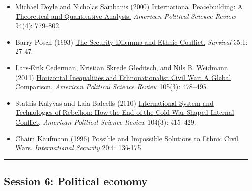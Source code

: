 \documentclass[12pt, a4paper]{article}
\begin{document}
\begin{itemize}
  \item Michael Doyle and Nicholas Sambanis (2000) \href{https://doi.org/10.2307/2586208}{International Peacebuilding: A Theoretical and Quantitative Analysis.} \textit{American Political Science Review} 94(4): 779--802.
  \item Barry Posen (1993) \href{https://doi.org/10.1080/00396339308442672}{The Security Dilemma and Ethnic Conflict.} \textit{Survival} 35:1: 27-47.
  \item Lars-Erik Cederman, Kristian Skrede Gleditsch, and Nils B. Weidmann (2011) \href{https://doi.org/10.1017/S0003055411000207}{Horizontal Inequalities and Ethnonationalist Civil War: A Global Comparison.} \textit{American Political Science Review} 105(3): 478--495.
  \item Stathis Kalyvas and Laia Balcells (2010) \href{https://doi.org/10.1017/S0003055410000286}{International System and Technologies of Rebellion: How the End of the Cold War Shaped Internal Conflict}. \textit{American Political Science Review} 104(3): 415--429.
	\item Chaim Kaufmann (1996) \href{https://doi.org/10.1162/isec.20.4.136}{Possible and Impossible Solutions to Ethnic Civil Wars.} \textit{International Security} 20:4: 136-175.
\end{itemize}


\vspace{20pt}
\hrule
\subsection*{Session 6: Political economy}
\end{document}
